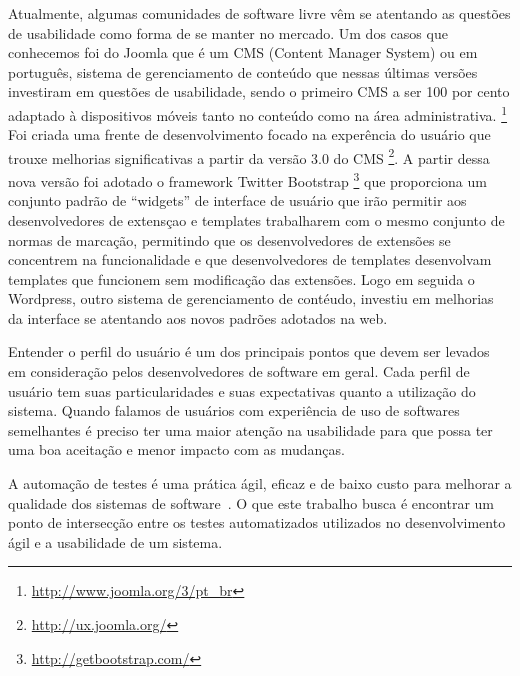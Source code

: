Atualmente, algumas comunidades de software livre vêm se atentando as questões de usabilidade como forma de se manter no mercado. Um dos casos que conhecemos foi do Joomla que é um CMS (Content Manager System) ou em português, sistema de gerenciamento de conteúdo que nessas últimas versões investiram em questões de usabilidade, sendo o primeiro CMS a ser 100 por cento adaptado à dispositivos móveis tanto no conteúdo como na área administrativa. \footnote{\url{http://www.joomla.org/3/pt_br}}
Foi criada uma frente de desenvolvimento focado na experência do usuário que trouxe melhorias significativas a partir da versão 3.0 do CMS \footnote{\url{http://ux.joomla.org/}}. A partir dessa nova versão foi adotado o framework Twitter Bootstrap \footnote{\url{http://getbootstrap.com/}} que proporciona um conjunto padrão de “widgets” de interface de usuário que irão permitir aos desenvolvedores de extensçao e templates  trabalharem com o mesmo conjunto de normas de marcação, permitindo que os desenvolvedores de extensões se concentrem na funcionalidade e que desenvolvedores de templates desenvolvam templates que funcionem sem modificação das extensões. 
Logo em seguida o Wordpress, outro sistema de gerenciamento de contéudo, investiu em melhorias da interface se atentando aos novos padrões adotados na web.

Entender o perfil do usuário é um dos principais pontos que devem ser levados em consideração pelos desenvolvedores de software em geral. Cada perfil de usuário tem suas particularidades e suas expectativas quanto a utilização do sistema. Quando falamos de usuários com experiência de uso de softwares semelhantes é preciso ter uma maior atenção na usabilidade para que possa ter uma boa aceitação e menor impacto com as mudanças.

A automação de testes é uma prática ágil, eficaz e de baixo custo para melhorar
a qualidade dos sistemas de software~\cite{cotter1995}. O que este trabalho busca é encontrar um ponto de intersecção entre os testes automatizados utilizados no desenvolvimento ágil e a usabilidade de um sistema. 

